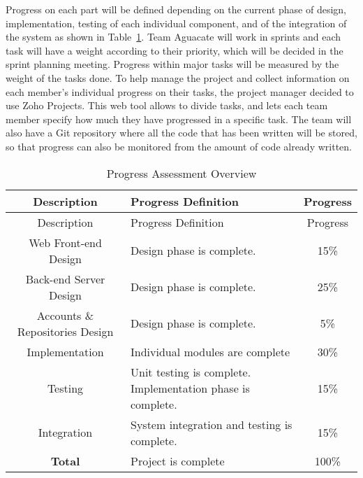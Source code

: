 
Progress on each part will be defined depending on the current phase of design,
implementation, testing of each individual component, and of the integration of
the system as shown in Table~\ref{asses}. Team Aguacate will work in sprints and
each task will have a weight according to their priority, which will be decided
in the sprint planning meeting. Progress within major tasks will be measured by
the weight of the tasks done. To help manage the project and collect information
on each member's individual progress on their tasks, the project manager decided
to use Zoho Projects. This web tool allows to divide tasks, and lets each team
member specify how much they have progressed in a specific task. The team will
also have a Git repository where all the code that has been written will be
stored, so that progress can also be monitored from the amount of code already
written.

\setlength{\extrarowheight}{1.5pt}
  \begin{longtable}{|c|m{7.5cm}|c|}
 \caption{Progress Assessment Overview \label{asses}} \\
   \hline
  
  \centering Description & Progress Definition & Progress \\
  \hline \hline \endfirsthead
  
     \hline

	\centering Description & Progress Definition & Progress \\
  \hline \hline \endhead
  
  \endfoot  
  
  Web Front-end Design & Design phase is complete. & 15\%\\ \hline   
  Back-end Server Design & Design phase is complete. & 25\%\\ \hline   
  Accounts \& Repositories Design & Design phase is complete. & 5\%\\ \hline 
  Implementation & Individual modules are complete & 30\%\\ \hline 
  Testing & Unit testing is complete. Implementation phase is complete. & 15\%\\ \hline
  Integration & System integration and testing is complete. & 15\%\\ \hline
  \textbf{Total} & Project is complete & 100\% \\ \hline   
  \end{longtable}